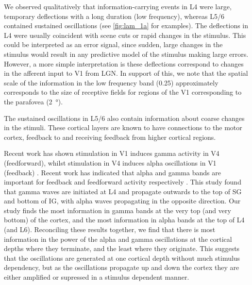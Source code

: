 We observed qualitatively that information-carrying events in \ac{L4} were large, temporary deflections with a long duration (low frequency), whereas \acs{L5/6} contained sustained oscillations (see \autoref{fig:lam_1a} for examples).
The deflections in \ac{L4} were usually coincident with scene cuts or rapid changes in the stimulus.
This could be interpreted as an error signal, since sudden, large changes in the stimulus would result in any predictive model of the stimulus making large errors.
However, a more simple interpretation is these deflections correspond to changes in the afferent input to \ac{V1} from \ac{LGN}.
In support of this, we note that the spatial scale of the information in the low frequency band (\SI{0.25}{\cpd}) approximately corresponds to the size of receptive fields for regions of the \ac{V1} corresponding to the parafovea (\SI{2}{\degree}).

The sustained oscillations in \acs{L5/6} also contain information about coarse changes in the stimuli.
These cortical layers are known to have connections to the motor cortex, feedback to  and receiving feedback from higher cortical regions.


Recent work has shown stimulation in \ac{V1} induces gamma activity in \ac{V4} (feedforward), whilst stimulation in \ac{V4} induces alpha oscillations in \ac{V1} (feedback) \citep{VanKerkoerle2014}.
Recent work has indicated that alpha and gamma bands are important for feedback and feedforward activity respectively \citep{VanKerkoerle2014}.
This study \citep{VanKerkoerle2014} found that gamma waves are initiated at \ac{L4} and propagate outwards to the top of \ac{SG} and bottom of \ac{IG}, with alpha waves propagating in the opposite direction.
Our study finds the most information in gamma bands at the very top (and very bottom) of the cortex, and the most information in alpha bands at the top of \ac{L4} (and \ac{L6}).
Reconciling these results together, we find that there is most information in the power of the alpha and gamma oscillations at the cortical depths where they terminate, and the least where they originate.
This suggests that the oscillations are generated at one cortical depth without much stimulus dependency, but as the oscillations propagate up and down the cortex they are either amplified or supressed in a stimulus dependent manner.
